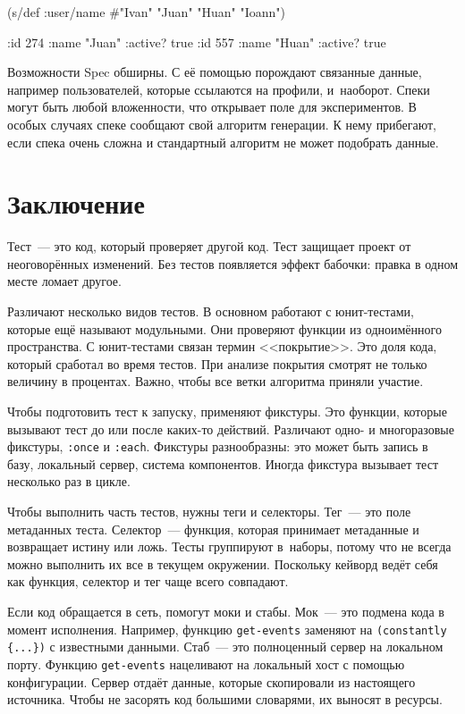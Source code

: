 \else

\begin{english}
  \begin{clojure}
(s/def :user/name #{"Ivan" "Juan" "Huan" "Ioann"})

{:id 274 :name "Juan" :active? true}
{:id 557 :name "Huan" :active? true}
  \end{clojure}
\end{english}

\fi

Возможности Spec обширны. С её помощью порождают связанные данные, например
пользователей, которые ссылаются на профили, и~наоборот. Спеки могут быть любой
вложенности, что открывает поле для экспериментов. В особых случаях спеке
сообщают свой алгоритм генерации. К нему прибегают, если спека очень сложна и
стандартный алгоритм не может подобрать данные.

\section{Заключение}

Тест~--- это код, который проверяет другой код. Тест защищает проект от
неоговорённых изменений. Без тестов появляется эффект бабочки: правка в одном
месте ломает другое.


Различают несколько видов тестов. В основном работают с юнит-тестами, которые
ещё называют модульными. Они проверяют функции из одноимённого пространства. С
юнит-тестами связан термин <<покрытие>>. Это доля кода, который сработал во
время тестов. При анализе покрытия смотрят не только величину в
процентах. Важно, чтобы все ветки алгоритма приняли участие.

Чтобы подготовить тест к запуску, применяют фикстуры. Это функции, которые
вызывают тест до или после каких-то действий. Различают одно- и многоразовые
фикстуры, \verb|:once| и \verb|:each|. Фикстуры разнообразны: это может быть
запись в базу, локальный сервер, система компонентов. Иногда фикстура вызывает
тест несколько раз в цикле.

Чтобы выполнить часть тестов, нужны теги и селекторы. Тег~--- это поле метаданных
теста. Селектор~--- функция, которая принимает метаданные и возвращает истину
или ложь. Тесты группируют в~наборы, потому что не всегда можно выполнить их все
в текущем окружении. Поскольку кейворд ведёт себя как функция, селектор и
тег чаще всего совпадают.

Если код обращается в сеть, помогут моки и стабы. Мок~--- это подмена кода в момент
исполнения. Например, функцию \verb|get-events| заменяют на
\verb|(constantly {...})| с известными данными. Стаб~--- это полноценный сервер на
локальном порту. Функцию \verb|get-events| нацеливают на локальный хост с
помощью конфигурации. Сервер отдаёт данные, которые скопировали из настоящего
источника. Чтобы не засорять код большими словарями, их выносят в ресурсы.

